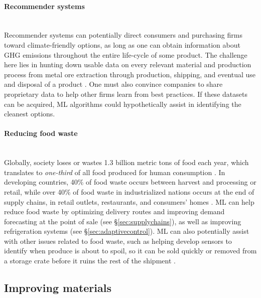 \documentclass[11pt]{report}
\newcommand{\Gap}{\texorpdfstring{\hfill}{}}
\newcommand{\Rec}{\texorpdfstring{{\small\emph{\color{blue}{\fbox{High Leverage}}}}}{}}
\begin{document}
\paragraph*{Recommender systems}\Gap \mbox{}\\\label{sec:recommendersystems}Recommender systems can potentially direct consumers and purchasing firms toward climate-friendly options, as long as one can obtain information about GHG emissions throughout the entire life-cycle of some product. The challenge here lies in hunting down usable data on every relevant material and production process from metal ore extraction through production, shipping, and eventual use and disposal of a product \cite{Hawkins2013,rebitzer2004life}. One must also convince companies to share proprietary data to help other firms learn from best practices. If these datasets can be acquired, ML algorithms could hypothetically assist in identifying the cleanest options.

\paragraph*{Reducing food waste}\Gap \Rec\mbox{}\\\label{sec:foodwaste}Globally, society loses or wastes 1.3 billion metric tons of food each year, which translates to \emph{one-third} of all food produced for human consumption \cite{faofood}. In developing countries, 40\% of food waste occurs between harvest and processing or retail, while over 40\% of food waste in industrialized nations occurs at the end of supply chains, in retail outlets, restaurants, and consumers' homes \cite{faofood}. ML can help reduce food waste by optimizing delivery routes and improving demand forecasting at the point of sale (see \S\ref{sec:supplychains}), as well as improving refrigeration systems \cite{meneghetti2015greening} (see \S\ref{sec:adaptivecontrol}). ML can also potentially assist with other issues related to food waste, such as helping develop sensors to identify when produce is about to spoil, so it can be sold quickly or removed from a storage crate before it ruins the rest of the shipment \cite{fuertes2016intelligent}.

\subsection{Improving materials}
\label{sec:materialsandconstruction}
\end{document}
